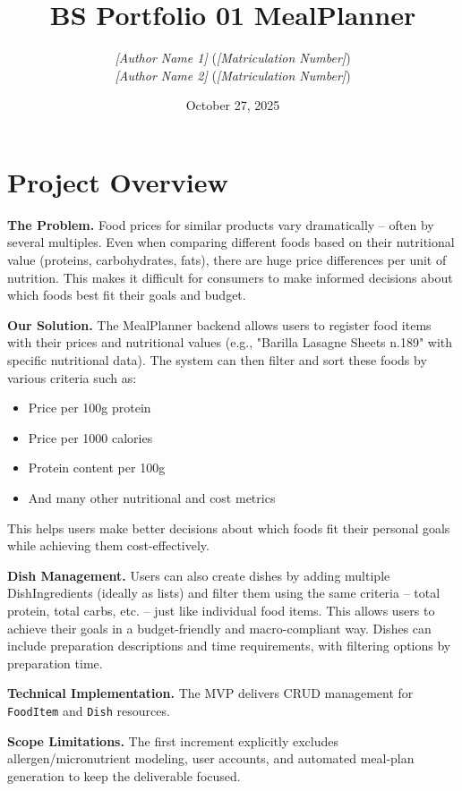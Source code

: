 \documentclass[11pt]{article}
\title{BS Portfolio 01 MealPlanner}
\author{
  \textit{[Author Name 1]} (\textit{[Matriculation Number]})\\
  \textit{[Author Name 2]} (\textit{[Matriculation Number]})
}
\date{October 27, 2025}
\begin{document}
\maketitle

\section{Project Overview}

\textbf{The Problem.} Food prices for similar products vary dramatically – often by several multiples. Even when comparing different foods based on their nutritional value (proteins, carbohydrates, fats), there are huge price differences per unit of nutrition. This makes it difficult for consumers to make informed decisions about which foods best fit their goals and budget.

\textbf{Our Solution.} The MealPlanner backend allows users to register food items with their prices and nutritional values (e.g., "Barilla Lasagne Sheets n.189" with specific nutritional data). The system can then filter and sort these foods by various criteria such as:
\begin{itemize}[noitemsep]
  \item Price per 100g protein
  \item Price per 1000 calories
  \item Protein content per 100g
  \item And many other nutritional and cost metrics
\end{itemize}

This helps users make better decisions about which foods fit their personal goals while achieving them cost-effectively.

\textbf{Dish Management.} Users can also create dishes by adding multiple DishIngredients (ideally as lists) and filter them using the same criteria – total protein, total carbs, etc. – just like individual food items. This allows users to achieve their goals in a budget-friendly and macro-compliant way. Dishes can include preparation descriptions and time requirements, with filtering options by preparation time.

\textbf{Technical Implementation.} The MVP delivers CRUD management for \texttt{FoodItem} and \texttt{Dish} resources. 

\textbf{Scope Limitations.} The first increment explicitly excludes allergen/micronutrient modeling, user accounts, and automated meal-plan generation to keep the deliverable focused.
\end{document}
